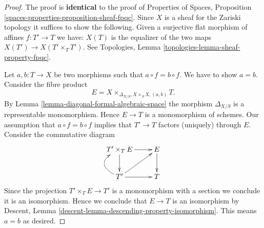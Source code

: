 \documentclass{stacks-project}
\theoremstyle{plain}
\theoremstyle{definition}
\theoremstyle{remark}
\numberwithin{equation}{subsection}
\begin{document}
\begin{proof}
The proof is {\bf identical} to the proof of
Properties of Spaces, Proposition
\ref{spaces-properties-proposition-sheaf-fpqc}.
Since $X$ is a sheaf for the Zariski topology it
suffices to show the following. Given a surjective
flat morphism of affines $f : T' \to T$ we have:
$X(T)$ is the equalizer of the two maps $X(T') \to X(T' \times_T T')$.
See Topologies, Lemma \ref{topologies-lemma-sheaf-property-fpqc}.

\medskip\noindent
Let $a, b : T \to X$ be two morphisms such that $a \circ f = b \circ f$.
We have to show $a = b$. Consider the fibre product
$$
E = X \times_{\Delta_{X/S}, X \times_S X, (a, b)} T.
$$
By Lemma \ref{lemma-diagonal-formal-algebraic-space}
the morphism $\Delta_{X/S}$ is a representable monomorphism. Hence
$E \to T$ is a monomorphism of schemes. Our assumption that
$a \circ f = b \circ f$ implies that $T' \to T$ factors (uniquely) through $E$.
Consider the commutative diagram
$$
\xymatrix{
T' \times_T E \ar[r] \ar[d] & E \ar[d] \\
T' \ar[r] \ar@/^5ex/[u] \ar[ru] & T
}
$$
Since the projection $T' \times_T E \to T'$ is a monomorphism
with a section we conclude it is an isomorphism. Hence we conclude that
$E \to T$ is an isomorphism by
Descent, Lemma \ref{descent-lemma-descending-property-isomorphism}.
This means $a = b$ as desired.


\end{proof}
\end{document}

